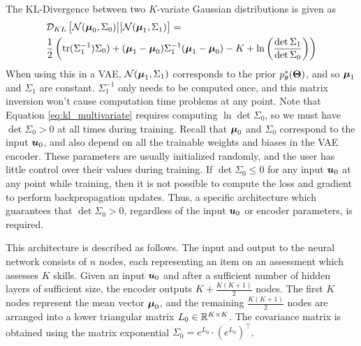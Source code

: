 The KL-Divergence between two $K$-variate Gaussian distributions is given as
\begin{equation}
\begin{split}
  &\mathcal{D}_{KL}\left[\mathcal{N}(\boldsymbol{\mu}_0, \Sigma_0) \big|\big| \mathcal{N}(\boldsymbol{\mu}_1, \Sigma_1) \right] = \\
&\frac{1}{2} \left( \text{tr}(\Sigma_1^{-1}) \Sigma_0) + (\boldsymbol{\mu}_1 - \boldsymbol{\mu}_0) \Sigma_1^{-1} (\boldsymbol{\mu}_1 - \boldsymbol{\mu}_0) - K + \ln\left( \frac{\det \Sigma_1}{\det \Sigma_0 }\right) \right)
  \label{eq:kl_multivariate}
\end{split}
\end{equation}
When using this in a VAE, $\mathcal{N}(\boldsymbol{\mu}_1, \Sigma_1)$ corresponds to the prior $p_\theta^*(\boldsymbol{\Theta})$, and so $\boldsymbol{\mu}_1$ and $\Sigma_1$ are constant. $\Sigma_1^{-1}$ only needs to be computed once, and this matrix inversion won't cause computation time problems at any point. Note that Equation \ref{eq:kl_multivariate} requires computing $\ln \det \Sigma_0$, so we must have $\det \Sigma_0 > 0$ at all times during training. Recall that $\boldsymbol{\mu}_0$ and $\Sigma_0$ correspond to the input $\boldsymbol{u}_0$, and also depend on all the trainable weights and biases in the VAE encoder. These parameters are usually initialized randomly, and the user has little control over their values during training. If $\det \Sigma_0 \leq 0$ for any input $\boldsymbol{u}_0$ at any point while training, then it is not possible to compute the loss and gradient to perform backpropagation updates. Thus, a specific architecture which guarantees that $\det \Sigma_0 > 0$, regardless of the input $\boldsymbol{u}_0$ or encoder parameters, is required.

This architecture is described as follows. The input and output to the neural network consists of $n$ nodes, each representing an item on an assessment which assesses $K$ skills. Given an input $\boldsymbol{u}_0$ and after a sufficient number of hidden layers of sufficient size, the encoder outputs $K + \frac{K(K+1)}{2}$ nodes. The first $K$ nodes represent the mean vector $\boldsymbol{\mu}_0$, and the remaining $\frac{K(K+1)}{2}$ nodes are arranged into a lower triangular matrix $L_0 \in \mathbb{R}^{K\times K}$. The covariance matrix is obtained using the matrix exponential $\Sigma_0 = e^{L_0} \cdot \left( e^{L_0} \right)^\top$.

